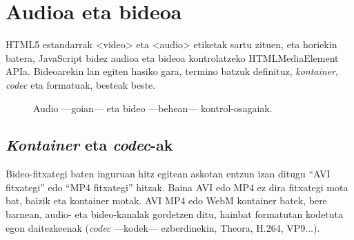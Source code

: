 \chapter{Audioa eta bideoa}

HTML5 estandarrak <video> eta <audio> etiketak sartu zituen, eta horiekin batera, JavaScript bidez audioa eta bideoa kontrolatzeko HTMLMediaElement APIa. Bideoarekin lan egiten hasiko gara, termino batzuk definituz, \textit{kontainer}, \textit{codec} eta formatuak, besteak beste. 


\begin{figure}[ht]
	\centering
{}
\caption{Audio —goian— eta bideo —behean— kontrol-osagaiak.}
\label{fig:bideocontrols}
\end{figure}

\section{\textit{Kontainer} eta \textit{codec}-ak}
Bideo-fitxategi baten inguruan hitz egitean askotan entzun izan ditugu ``AVI fitxategi'' edo ``MP4 fitxategi'' hitzak. Baina AVI edo MP4 ez dira fitxategi mota bat, baizik eta kontainer motak. AVI MP4 edo WebM  kontainer batek, bere barnean, audio- eta bideo-kanalak gordetzen ditu, hainbat formatutan kodetuta egon daitezkeenak (\textit{codec} —kodek— ezberdinekin, Theora, H.264, VP9...).

